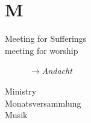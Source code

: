 \section*{M}

\articlesize

\begin{description}

 \item[Meeting for Sufferings]
 
 \item[meeting for worship]  $\to$\textit{Andacht}
 
 \item[Ministry]
 
 \item[Monatsversammlung]
 
 \item[Musik]
 
 \end{description}

\normalsize
